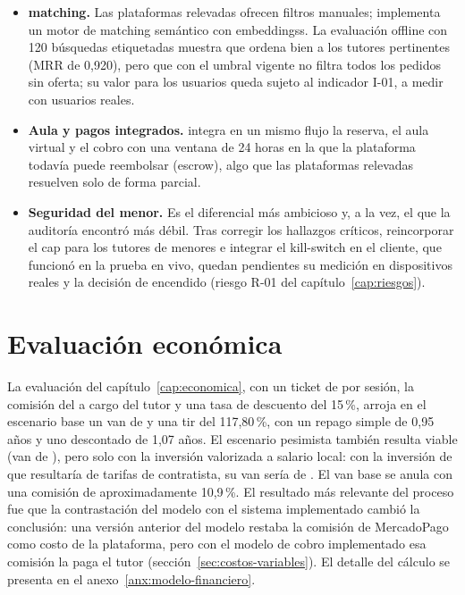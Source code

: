 \begin{itemize}
    \item \textbf{\Gls{matching}.} Las plataformas relevadas ofrecen
          filtros manuales; \sistema{} implementa un motor de
          \gls{matching} semántico con \glspl{embeddings}. La evaluación
          offline con 120 búsquedas etiquetadas muestra que ordena bien a
          los tutores pertinentes (MRR de 0,920), pero que con el umbral
          vigente no filtra todos los pedidos sin oferta; su valor para los
          usuarios queda sujeto al indicador I-01, a medir con usuarios
          reales.
    \item \textbf{Aula y pagos integrados.} \sistema{} integra en un
          mismo flujo la reserva, el aula virtual y el cobro con una
          ventana de 24 horas en la que la plataforma todavía puede
          reembolsar (\gls{escrow}), algo que las plataformas relevadas
          resuelven solo de forma parcial.
    \item \textbf{Seguridad del menor.} Es el diferencial más ambicioso y,
          a la vez, el que la auditoría encontró más débil. Tras corregir
          los hallazgos críticos, reincorporar el \gls{cap} para los
          tutores de menores e integrar el kill-switch en el cliente, que
          funcionó en la prueba en vivo, quedan pendientes su medición en
          dispositivos reales y la decisión de encendido (riesgo R-01 del
          capítulo~\ref{cap:riesgos}).
\end{itemize}

\section{Evaluación económica}

La evaluación del capítulo~\ref{cap:economica}, con un ticket de
 por sesión, la comisión del \comision{} a cargo del tutor y
una tasa de descuento del 15\,\%, arroja en el escenario base un
\gls{van} de  y una \gls{tir} del 117,80\,\%, con un repago
simple de 0,95 años y uno descontado de 1,07 años. El escenario
pesimista también resulta viable (\gls{van} de ), pero solo
con la inversión valorizada a salario local: con la inversión de
 que resultaría de tarifas de contratista, su \gls{van} sería
de . El \gls{van}
base se anula con una comisión de aproximadamente 10,9\,\%. El resultado
más relevante del proceso fue que la contrastación del modelo con el
sistema implementado cambió la conclusión: una versión anterior del
modelo restaba la comisión de MercadoPago como costo de la plataforma,
pero con el modelo de cobro implementado esa comisión la paga el tutor
(sección~\ref{sec:costos-variables}). El detalle del cálculo se presenta
en el anexo~\ref{anx:modelo-financiero}.

